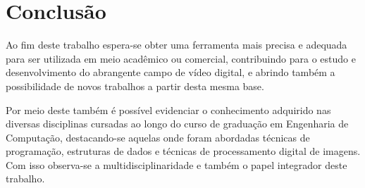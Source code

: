 \chapter{Conclusão}

Ao fim deste trabalho espera-se obter uma ferramenta mais precisa e adequada para ser utilizada em meio acadêmico ou comercial, contribuindo para o estudo e desenvolvimento do abrangente campo de vídeo digital, e abrindo também a possibilidade de novos trabalhos a partir desta mesma base.

Por meio deste também é possível evidenciar o conhecimento adquirido nas diversas disciplinas cursadas ao longo do curso de graduação em Engenharia de Computação, destacando-se aquelas onde foram abordadas técnicas de programação, estruturas de dados e técnicas de processamento digital de imagens. Com isso observa-se a multidisciplinaridade e também o papel integrador deste trabalho.
